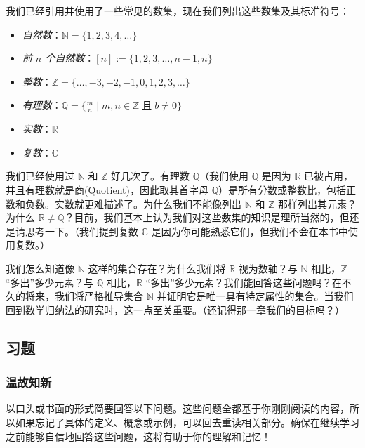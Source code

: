 我们已经引用并使用了一些常见的数集，现在我们列出这些数集及其标准符号：

\begin{center}
\begin{itemize}
    \item \emph{自然数}：$\mathbb{N} = \{1, 2, 3, 4, \dots \}$
    \item \emph{前 $n$ 个自然数}：$[n] := \{1, 2, 3, \dots , n-1, n \}$
    \item \emph{整数}：$\mathbb{Z} = \{\dots, -3, -2, -1, 0, 1, 2, 3, \dots \}$
    \item \emph{有理数}：$\mathbb{Q} = \{\frac{m}{n} \mid m,n \in \mathbb{Z} \;\text{且}\; b \ne 0 \}$
    \item \emph{实数}：$\mathbb{R}$
    \item \emph{复数}：$\mathbb{C}$
\end{itemize}
\end{center}

我们已经使用过 $\mathbb{N}$ 和 $\mathbb{Z}$ 好几次了。有理数 $\mathbb{Q}$（我们使用 $\mathbb{Q}$ 是因为 $\mathbb{R}$ 已被占用，并且有理数就是商(Quotient)，因此取其首字母 $\mathbb{Q}$）是所有分数或整数比，包括正数和负数。实数就更难描述了。为什么我们不能像列出 $\mathbb{N}$ 和 $\mathbb{Z}$ 那样列出其元素？为什么 $\mathbb{R} \ne \mathbb{Q}$？目前，我们基本上认为我们对这些数集的知识是理所当然的，但还是请思考一下。（我们提到复数 $\mathbb{C}$ 是因为你可能熟悉它们，但我们不会在本书中使用复数。）

我们怎么知道像 $\mathbb{N}$ 这样的集合存在？为什么我们将 $\mathbb{R}$ 视为数轴？与 $\mathbb{N}$ 相比，$\mathbb{Z}$ ``多出''多少元素？与 $\mathbb{Q}$ 相比，$\mathbb{R}$ ``多出''多少元素？我们能回答这些问题吗？在不久的将来，我们将严格推导集合 $\mathbb{N}$ 并证明它是唯一具有特定属性的集合。当我们回到数学归纳法的研究时，这一点至关重要。（还记得那一章我们的目标吗？）

\subsection{习题}

\subsubsection*{温故知新}

以口头或书面的形式简要回答以下问题。这些问题全都基于你刚刚阅读的内容，所以如果忘记了具体的定义、概念或示例，可以回去重读相关部分。确保在继续学习之前能够自信地回答这些问题，这将有助于你的理解和记忆！

